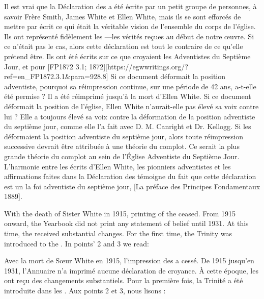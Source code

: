 Il est vrai que la Déclaration des  a été écrite par un petit groupe de personnes, à savoir Frère Smith, James White et Ellen White, mais ils se sont efforcés de mettre par écrit ce qui était la véritable vision de l'ensemble du corps de l'église. Ils ont représenté fidèlement les —les vérités reçues au début de notre œuvre. Si ce n'était pas le cas, alors cette déclaration est tout le contraire de ce qu'elle prétend être. Ils ont été écrits  sur ce que croyaient les Adventistes du Septième Jour,  et pour [FP1872 3.1; 1872][https://egwwritings.org/?ref=en\_FP1872.3.1&para=928.8] Si ce document déformait la position adventiste, pourquoi sa réimpression continue, sur une période de 42 ans, a-t-elle été permise ? Il a été réimprimé jusqu'à la mort d'Ellen White. Si ce document déformait la position de l'église, Ellen White n'aurait-elle pas élevé sa voix contre lui ? Elle a toujours élevé sa voix contre la déformation de la position adventiste du septième jour, comme elle l'a fait avec D. M. Canright et Dr. Kellogg. Si les  déformaient la position adventiste du septième jour, alors toute réimpression successive devrait être attribuée à une théorie du complot. Ce serait la plus grande théorie du complot au sein de l'Église Adventiste du Septième Jour. L'harmonie entre les écrits d'Ellen White, les pionniers adventistes et les affirmations faites dans la Déclaration des  témoigne du fait que cette déclaration est un  la foi adventiste du septième jour, [La préface des Principes Fondamentaux 1889].


With the death of Sister White in 1915, printing of the  ceased. From 1915 onward, the Yearbook did not print any statement of belief until 1931. At this time, the  received substantial changes. For the first time, the Trinity was introduced to the . In points’ 2 and 3 we read:


Avec la mort de Sœur White en 1915, l'impression des  a cessé. De 1915 jusqu'en 1931, l'Annuaire n'a imprimé aucune déclaration de croyance. À cette époque, les  ont reçu des changements substantiels. Pour la première fois, la Trinité a été introduite dans les . Aux points 2 et 3, nous lisons :


